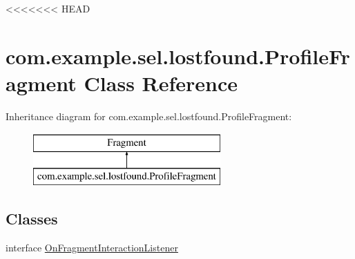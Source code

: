 <<<<<<< HEAD
\hypertarget{classcom_1_1example_1_1sel_1_1lostfound_1_1ProfileFragment}{\section{com.\-example.\-sel.\-lostfound.\-Profile\-Fragment Class Reference}
\label{classcom_1_1example_1_1sel_1_1lostfound_1_1ProfileFragment}
}
Inheritance diagram for com.\-example.\-sel.\-lostfound.\-Profile\-Fragment\-:\begin{figure}[H]
\begin{center}
\leavevmode
\includegraphics[height=2.000000cm]{classcom_1_1example_1_1sel_1_1lostfound_1_1ProfileFragment}
\end{center}
\end{figure}
\subsection*{Classes}
\begin{DoxyCompactItemize}
\item 
interface \hyperlink{interfacecom_1_1example_1_1sel_1_1lostfound_1_1ProfileFragment_1_1OnFragmentInteractionListener}{On\-Fragment\-Interaction\-Listener}
\end{DoxyCompactItemize}
